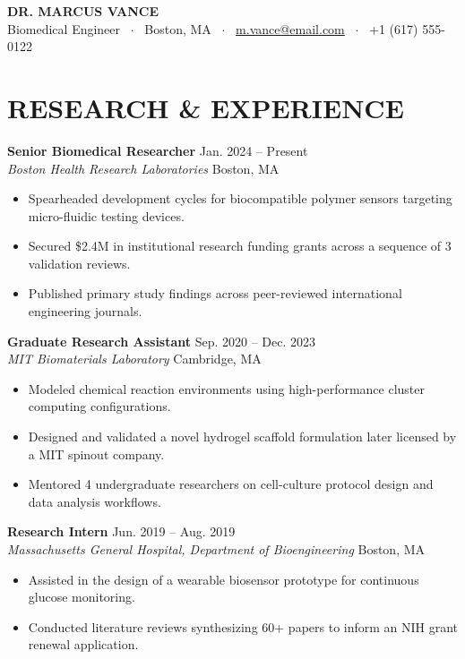 \documentclass[10pt,letterpaper]{article}
\begin{document}
\color{charcoal}

\begin{center}
    {\Huge \textbf{\color{charcoal} DR. MARCUS VANCE}} \\ \vspace{4pt}
    \small Biomedical Engineer \ $\cdot$ \ Boston, MA \ $\cdot$ \ \href{mailto:m.vance@email.com}{m.vance@email.com} \ $\cdot$ \ +1 (617) 555-0122
\end{center}
\vspace{4pt}

\section{RESEARCH \& EXPERIENCE}

\textbf{Senior Biomedical Researcher} \hfill Jan. 2024 -- Present \\
\textit{Boston Health Research Laboratories} \hfill Boston, MA
\begin{itemize}[leftmargin=0.15in, topsep=2pt, itemsep=2pt]
    \item Spearheaded development cycles for biocompatible polymer sensors targeting micro-fluidic testing devices.
    \item Secured \$2.4M in institutional research funding grants across a sequence of 3 validation reviews.
    \item Published primary study findings across peer-reviewed international engineering journals.
\end{itemize}

\vspace{6pt}
\textbf{Graduate Research Assistant} \hfill Sep. 2020 -- Dec. 2023 \\
\textit{MIT Biomaterials Laboratory} \hfill Cambridge, MA
\begin{itemize}[leftmargin=0.15in, topsep=2pt, itemsep=2pt]
    \item Modeled chemical reaction environments using high-performance cluster computing configurations.
    \item Designed and validated a novel hydrogel scaffold formulation later licensed by a MIT spinout company.
    \item Mentored 4 undergraduate researchers on cell-culture protocol design and data analysis workflows.
\end{itemize}

\vspace{6pt}
\textbf{Research Intern} \hfill Jun. 2019 -- Aug. 2019 \\
\textit{Massachusetts General Hospital, Department of Bioengineering} \hfill Boston, MA
\begin{itemize}[leftmargin=0.15in, topsep=2pt, itemsep=2pt]
    \item Assisted in the design of a wearable biosensor prototype for continuous glucose monitoring.
    \item Conducted literature reviews synthesizing 60+ papers to inform an NIH grant renewal application.
\end{itemize}
\end{document}
